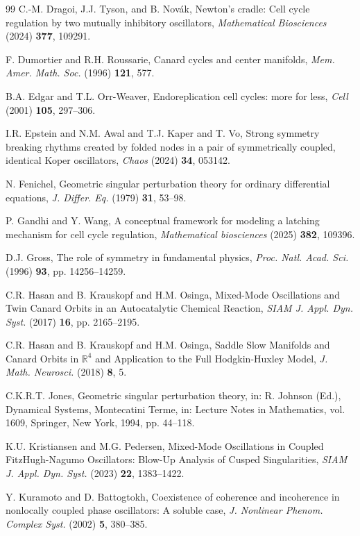 \documentclass[10pt,onecolumn]{article}
\theoremstyle{plain}
\begin{document}
\begin{thebibliography}{99}
C.-M. Dragoi, J.J. Tyson, and B. Nov\'{a}k,
Newton's cradle: Cell cycle regulation by two mutually inhibitory oscillators,
{\it Mathematical Biosciences} (2024) {\bf 377}, 109291.

F. Dumortier and R.H. Roussarie,
Canard cycles and center manifolds,
{\it Mem. Amer. Math. Soc.} (1996) {\bf 121}, 577.

B.A. Edgar and T.L. Orr-Weaver, 
Endoreplication cell cycles: more for less,
{\it Cell} (2001)
{\bf 105}, 297--306.

I.R. Epstein and N.M. Awal and T.J. Kaper and T. Vo,
Strong symmetry breaking rhythms created by folded nodes in a pair of symmetrically coupled, identical Koper oscillators,
{\it Chaos} (2024) {\bf 34}, 053142.

N. Fenichel,
Geometric singular perturbation theory for ordinary differential equations,
{\it J. Differ. Eq.} (1979) {\bf 31}, 53--98.

P. Gandhi and Y. Wang,
A conceptual framework for modeling a latching mechanism for cell cycle regulation,
{\it Mathematical biosciences} (2025) {\bf 382},
109396.

D.J. Gross,
The role of symmetry in fundamental physics,
{\it Proc. Natl. Acad. Sci.} (1996) {\bf 93}, pp. 14256--14259.

C.R. Hasan and B. Krauskopf and H.M. Osinga,
Mixed-Mode Oscillations and Twin Canard Orbits in an Autocatalytic Chemical Reaction,
{\it SIAM J. Appl. Dyn. Syst.} (2017) {\bf 16}, pp. 2165--2195.

C.R. Hasan and B. Krauskopf and H.M. Osinga,
Saddle Slow Manifolds and Canard Orbits in $\mathbb R^4$ and Application to the Full Hodgkin-Huxley Model,
{\it J. Math. Neurosci.} (2018) {\bf 8}, 5.

C.K.R.T. Jones,
Geometric singular perturbation theory,
in: R. Johnson (Ed.), Dynamical Systems, Montecatini Terme,
in: Lecture Notes in Mathematics, vol. 1609, Springer, New York, 1994, pp. 44--118. 

K.U. Kristiansen and M.G. Pedersen,
Mixed-Mode Oscillations in Coupled FitzHugh-Nagumo Oscillators: Blow-Up Analysis of Cusped Singularities,
{\it SIAM J. Appl. Dyn. Syst.} (2023) {\bf 22}, 1383--1422.

Y. Kuramoto and D. Battogtokh,
Coexistence of coherence and incoherence in nonlocally coupled phase oscillators: A soluble case,
{\it J. Nonlinear Phenom. Complex Syst.} (2002) {\bf 5}, 380--385.


\end{thebibliography}
\end{document}
